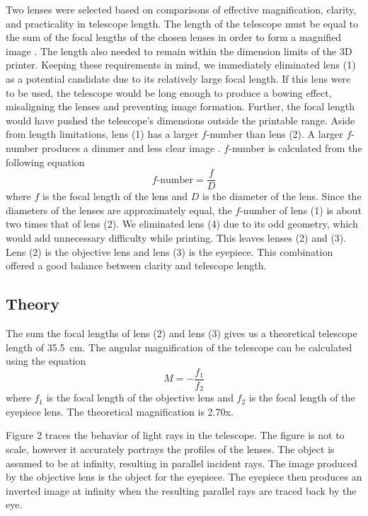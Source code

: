 Two lenses were selected based on comparisons of effective magnification, clarity, and practicality in telescope length. The length of the telescope must be equal to the sum of the focal lengths of the chosen lenses in order to form a magnified image \cite{tb}. The length also needed to remain within the dimension limits of the 3D printer. Keeping these requirements in mind, we immediately eliminated lens (1) as a potential candidate due to its relatively large focal length. If this lens were to be used, the telescope would be long enough to produce a bowing effect, misaligning the lenses and preventing image formation. Further, the focal length would have pushed the telescope’s dimensions outside the printable range. Aside from length limitations, lens (1) has a larger $f$-number than lens (2). A larger $f$-number produces a dimmer and less clear image \cite{tb}. $f$-number is calculated from the following equation
\[f\text{-number} = \dfrac{f}{D}\]
where $f$ is the focal length of the lens and $D$ is the diameter of the lens. Since the diameters of the lenses are approximately equal, the $f$-number of lens (1) is about two times that of lens (2). We eliminated lens (4) due to its odd geometry, which would add unnecessary difficulty while printing. This leaves lenses (2) and (3). Lens (2) is the objective lens and lens (3) is the eyepiece. This combination offered a good balance between clarity and telescope length.

\subsection{Theory}

The sum the focal lengths of lens (2) and lens (3) gives us a theoretical telescope length of \SI{35.5}{\centi\meter}. The angular magnification of the telescope can be calculated using the equation
\begin{equation}\label{mag}
  M=-\dfrac{f_1}{f_2}
\end{equation}
where $f_1$ is the focal length of the objective lens and $f_2$ is the focal length of the eyepiece lens. The theoretical magnification is \SI{2.70}{}x. 


Figure 2 traces the behavior of light rays in the telescope. The figure is not to scale, however it accurately portrays the profiles of the lenses. The object is assumed to be at infinity, resulting in parallel incident rays. The image produced by the objective lens is the object for the eyepiece. The eyepiece then produces an inverted image at infinity when the resulting parallel rays are traced back by the eye.

